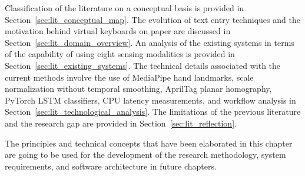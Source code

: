 Classification of the literature on a conceptual basis is provided in Section~\ref{sec:lit_conceptual_map}. The evolution of text entry techniques and the motivation behind virtual keyboards on paper are discussed in Section~\ref{sec:lit_domain_overview}. An analysis of the existing systems in terms of the capability of using eight sensing modalities is provided in Section~\ref{sec:lit_existing_systems}. The technical details associated with the current methods involve the use of MediaPipe hand landmarks, scale normalization without temporal smoothing, AprilTag planar homography, PyTorch LSTM classifiers, CPU latency measurements, and workflow analysis in Section~\ref{sec:lit_technological_analysis}. The limitations of the previous literature and the research gap are provided in Section~\ref{sec:lit_reflection}.

The principles and technical concepts that have been elaborated in this chapter are going to be used for the development of the research methodology, system requirements, and software architecture in future chapters.
